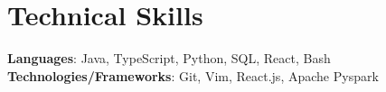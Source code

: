 \section{Technical Skills}
\begin{itemize}[leftmargin=0.15in, label={}]
	\small{\item{
	      \textbf{Languages}{: Java, TypeScript, Python, SQL, React, Bash } \\
	      \textbf{Technologies/Frameworks}{: Git, Vim, React.js, Apache Pyspark}}} \\
\end{itemize}

